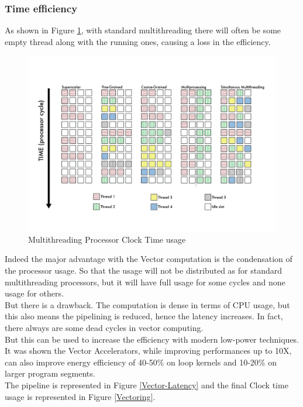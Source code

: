 \subsubsection{Time efficiency}
As shown in Figure \ref{Multithreading}, with standard multithreading there will often be some empty thread along with the running ones, causing a loss in the efficiency.
\begin{figure}[H]
    \centering
    \includegraphics[scale = 0.5]{Chapter_1/img/threads.png}
    \caption{Multithreading Processor Clock Time usage  \cite{L15-Krste}}
    \label{Multithreading}
\end{figure}

Indeed the major advantage with the Vector computation is the condensation of the processor usage. 
So that the usage will not be distributed as for standard multithreading processors, but it will have full usage for some cycles and none usage for others\cite{L15-Krste}.\\

But there is a drawback. The computation is dense in terms of CPU usage, but this also means the pipelining is reduced, hence the latency increases. In fact, there always are some dead cycles in vector computing.\\
But this can be used to increase the efficiency with modern low-power techniques. It was shown \cite{Lemuet2006} the Vector Accelerators, while improving performances up to 10X, can also improve energy efficiency of 40-50\% on loop kernels and 10-20\% on larger program segments.\\ 
The pipeline is represented in Figure \ref{Vector-Latency} and the final Clock time usage is represented in Figure \ref{Vectoring}.

